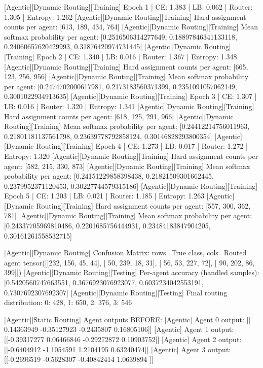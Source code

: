 [Agentic][Dynamic Routing][Training] Epoch 1 | CE: 1.383 | LB: 0.062 | Router: 1.305 | Entropy: 1.262
[Agentic][Dynamic Routing][Training] Hard assignment counts per agent: [613, 189, 434, 764]
[Agentic][Dynamic Routing][Training] Mean softmax probability per agent: [0.2516506314277649, 0.18897846341133118, 0.24060657620429993, 0.31876420974731445]
[Agentic][Dynamic Routing][Training] Epoch 2 | CE: 1.340 | LB: 0.016 | Router: 1.367 | Entropy: 1.348
[Agentic][Dynamic Routing][Training] Hard assignment counts per agent: [665, 123, 256, 956]
[Agentic][Dynamic Routing][Training] Mean softmax probability per agent: [0.2474702000617981, 0.2173183560371399, 0.2351091057062149, 0.3001022934913635]
[Agentic][Dynamic Routing][Training] Epoch 3 | CE: 1.307 | LB: 0.016 | Router: 1.320 | Entropy: 1.341
[Agentic][Dynamic Routing][Training] Hard assignment counts per agent: [618, 125, 291, 966]
[Agentic][Dynamic Routing][Training] Mean softmax probability per agent: [0.24412214756011963, 0.21801181137561798, 0.23639778792858124, 0.30146828293800354]
[Agentic][Dynamic Routing][Training] Epoch 4 | CE: 1.273 | LB: 0.017 | Router: 1.272 | Entropy: 1.320
[Agentic][Dynamic Routing][Training] Hard assignment counts per agent: [582, 215, 330, 873]
[Agentic][Dynamic Routing][Training] Mean softmax probability per agent: [0.24151229858398438, 0.21821509301662445, 0.2379952371120453, 0.30227744579315186]
[Agentic][Dynamic Routing][Training] Epoch 5 | CE: 1.203 | LB: 0.021 | Router: 1.185 | Entropy: 1.263
[Agentic][Dynamic Routing][Training] Hard assignment counts per agent: [557, 300, 362, 781]
[Agentic][Dynamic Routing][Training] Mean softmax probability per agent: [0.24337705969810486, 0.2201685756444931, 0.23484183847904205, 0.30161261558532715]

[Agentic][Dynamic Routing] Confusion Matrix: rows=True class, cols=Routed agent
tensor([[232, 156,  45,  44],
[ 50, 239,  18,  31],
[ 56,  53, 227,  72],
[ 90, 202,  86, 399]])
[Agentic][Dynamic Routing][Testing] Per-agent accuracy (handled samples): [0.5420560747663551, 0.3676923076923077, 0.6037234042553191, 0.7307692307692307]
[Agentic][Dynamic Routing][Testing] Final routing distribution: {0: 428, 1: 650, 2: 376, 3: 546}

[Agentic][Static Routing] Agent outputs BEFORE:
[Agentic] Agent 0 output: [[ 0.14363949 -0.35127923 -0.2435807   0.16805106]]
[Agentic] Agent 1 output: [[-0.39317277  0.06466846 -0.29272872  0.10903752]]
[Agentic] Agent 2 output: [[-0.6404912  -1.1054591   1.2104195   0.63240474]]
[Agentic] Agent 3 output: [[-0.2696519  -0.5628307  -0.40842414  1.0639894 ]]

